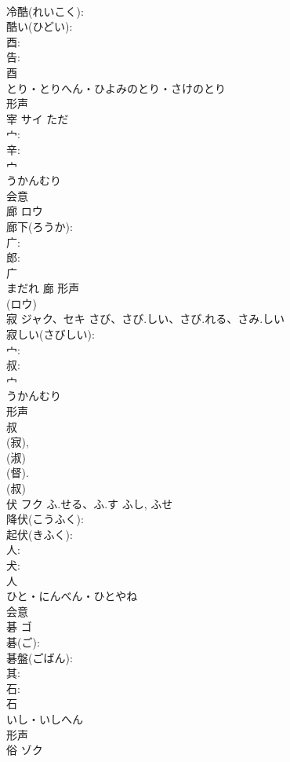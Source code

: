 \documentclass[8pt]{extreport}
\begin{document}
\begin{CJK}{UTF8}{min}
\\	冷酷(れいこく): 
\\	酷い(ひどい): 
\\	酉: 
\\	告: 
\\	酉	
\\	とり・とりへん・ひよみのとり・さけのとり	
\\	形声 
\\	宰	サイ		ただ	
\\	宀: 
\\	辛: 
\\	宀	
\\	うかんむり	
\\	会意 
\\	廊	ロウ			
\\	廊下(ろうか): 
\\	广: 
\\	郎: 
\\	广	
\\	まだれ	廊	形声 
\\	(ロウ) 
\\	寂	ジャク、セキ	さび、さび.しい、さび.れる、さみ.しい		
\\	寂しい(さびしい): 
\\	宀: 
\\	叔: 
\\	宀	
\\	うかんむり	
\\	形声 
\\	叔 
\\	(寂), 
\\	(淑) 
\\	(督). 
\\	(叔) 
\\	伏	フク	ふ.せる、ふ.す	ふし, ふせ	
\\	降伏(こうふく): 
\\	起伏(きふく): 
\\	人: 
\\	犬: 
\\	人	
\\	ひと・にんべん・ひとやね	
\\	会意 
\\	碁	ゴ			
\\	碁(ご): 
\\	碁盤(ごばん): 
\\	其: 
\\	石: 
\\	石	
\\	いし・いしへん	
\\	形声 
\\	俗	ゾク			

\end{CJK}
\end{document}

